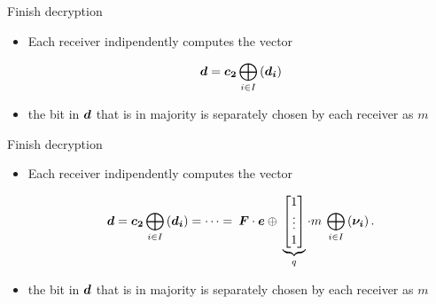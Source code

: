 \begin{frame}
\begin{overprint}
 \begin{block}{Finish decryption}
 \begin{itemize}
  \item<19> Each receiver \alert{indipendently} computes the vector 
 
%  
 \begin{eqnarray*}
 \boldsymbol{d} =  \boldsymbol{c_2} \bigoplus_{i \in I} \left( \boldsymbol{d_i} \right)  
 \end{eqnarray*}
 
 \item<20> the bit in $\boldsymbol{d}$ that is in majority is separately chosen by each receiver as $m$
 \end{itemize}
 \end{block}
 
 \begin{block}{Finish decryption}
 \begin{itemize}
  \item<20-> Each receiver \alert{indipendently} computes the vector 
 
%  
 \begin{eqnarray*}
 \boldsymbol{d} =  \boldsymbol{c_2} \bigoplus_{i \in I} \left( \boldsymbol{d_i} \right)  
 	  = \dots = \: \boldsymbol{F}\cdot \boldsymbol{e} \mathbin{\oplus} \: \underbrace{\begin{bmatrix} 1 \\ \vdots \\ 1 \end{bmatrix}}_{q} \cdot m \: \bigoplus_{i \in I} \left( \boldsymbol{\nu_i} \right) .
 \end{eqnarray*}
 
 \item<21-> the bit in $\boldsymbol{d}$ that is in majority is separately chosen by each receiver as $m$
 \end{itemize}
 \end{block}
 
\end{overprint}


  

\end{frame}

